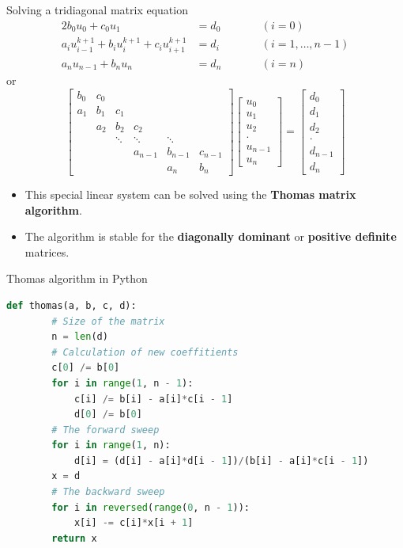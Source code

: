 \begin{frame}{Solving a tridiagonal matrix equation}
\vskip -15pt
%
\begin{alignat*}{2}
b_{0}u_{0}+c_{0}u_{1} & =d_{0} &  & (i=0)\\
a_{i}u_{i-1}^{k+1}+b_{i}u_{i}^{k+1}+c_{i}u_{i+1}^{k+1} & =d_{i} & \qquad & (i=1,\ldots,n-1)\\
a_{n}u_{n-1}+b_{n}u_{n} & =d_{n} &  & (i=n)
\end{alignat*}
%
or
%
\[
\begin{bmatrix}b_{0} & c_{0}\\
a_{1} & b_{1} & c_{1}\\
 & a_{2} & b_{2} & c_{2}\\
 &  &  \ddots & \ddots & \ddots & \\
 &  &  & a_{n-1} & b_{n-1} & c_{n-1}\\
 &  &  &  & a_{n} & b_{n}
\end{bmatrix}\begin{bmatrix}u_{0}\\
u_{1}\\
u_{2}\\
\cdot\\
u_{n-1} \\
u_{n}
\end{bmatrix}=\begin{bmatrix}d_{0}\\
d_{1}\\
d_{2}\\
\cdot\\
d_{n-1} \\
d_{n}
\end{bmatrix}
\]
\begin{itemize}
	\item This special linear system can be solved using the \alert{\bf Thomas matrix algorithm}.
	\item The algorithm is stable for the \alert{\bf diagonally dominant} or \alert{\bf  positive definite} matrices.
\end{itemize}

\end{frame}
%
%
\begin{frame}[fragile]{Thomas algorithm in Python}

\begin{lstlisting}[language=Python, caption=Thomas algorithm for tridiagonal matrices]
	def thomas(a, b, c, d):
		# Size of the matrix
		n = len(d)
		# Calculation of new coeffitients 
		c[0] /= b[0]
		for i in range(1, n - 1):
			c[i] /= b[i] - a[i]*c[i - 1]
			d[0] /= b[0]
		# The forward sweep 
		for i in range(1, n):
			d[i] = (d[i] - a[i]*d[i - 1])/(b[i] - a[i]*c[i - 1])
		x = d
		# The backward sweep 
		for i in reversed(range(0, n - 1)):
			x[i] -= c[i]*x[i + 1]
		return x
\end{lstlisting}

\end{frame}
